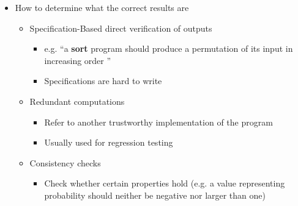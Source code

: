 \begin{itemize}
\begin{itemize}
		\item How to determine what the correct results are
		\begin{itemize}
			\item Specification-Based direct verification of outputs
			\begin{itemize}
				\item e.g. “a \textbf{sort} program should produce a permutation of its input in increasing order ”
				\item Specifications are hard to write
			\end{itemize}
			\item Redundant computations
			\begin{itemize}
				\item Refer to another trustworthy implementation of the program
				\item Usually used for regression testing
			\end{itemize}
			\item Consistency checks
			\begin{itemize}
				\item Check whether certain properties hold (e.g. a value representing probability
				should neither be negative nor larger than one)
			\end{itemize}
		\end{itemize}
	\end{itemize}
\end{itemize}
